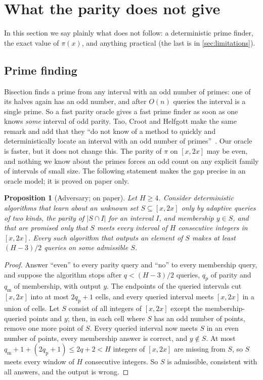 \documentclass[10pt]{amsart}
\theoremstyle{plain}
\newtheorem{proposition}[theorem]{Proposition}
\theoremstyle{definition}
\theoremstyle{remark}
\numberwithin{equation}{section}
\begin{document}
\section{What the parity does not give}\label{sec:not}

In this section we say plainly what does not follow: a deterministic prime finder, the exact value of
$\pi(x)$, and anything practical (the last is in \cref{sec:limitations}).

\subsection{Prime finding}
Bisection finds a prime from any interval with an odd number of primes: one of its halves again has an
odd number, and after $O(n)$ queries the interval is a single prime. So a fast parity oracle gives a fast
prime finder as soon as one knows \emph{some} interval of odd parity. Tao, Croot and Helfgott make the
same remark and add that they ``do not know of a method to quickly and deterministically locate an
interval with an odd number of primes''~\cite[\S1]{TCH12}. Our oracle is faster, but it does not change
this. The parity of $\pi$ on $[x,2x]$ may be even, and nothing we know about the primes forces an odd
count on any explicit family of intervals of small size. The following statement makes the gap precise in
an oracle model; it is proved on paper only.

\begin{proposition}[Adversary; on paper]\label{prop:adv}
Let $H\ge4$. Consider deterministic algorithms that learn about an unknown set $S\subseteq[x,2x]$ only
by adaptive queries of two kinds, the parity of $|S\cap I|$ for an interval $I$, and membership $y\in S$,
and that are promised only that $S$ meets every interval of $H$ consecutive integers in $[x,2x]$. Every
such algorithm that outputs an element of $S$ makes at least $(H-3)/2$ queries on some admissible $S$.
\end{proposition}

\begin{proof}
Answer ``even'' to every parity query and ``no'' to every membership query, and suppose the algorithm
stops after $q<(H-3)/2$ queries, $q_{\mathrm p}$ of parity and $q_{\mathrm m}$ of membership, with
output $y$. The endpoints of the queried intervals cut $[x,2x]$ into at most $2q_{\mathrm p}+1$ cells, and every queried interval meets $[x,2x]$ in a union of cells. Let $S$ consist of
all integers of $[x,2x]$ except the membership-queried points and $y$; then, in each cell where $S$ has
an odd number of points, remove one more point of $S$. Every queried interval now meets $S$ in an even
number of points, every membership answer is correct, and $y\notin S$. At most
$q_{\mathrm m}+1+(2q_{\mathrm p}+1)\le2q+2<H$ integers of $[x,2x]$ are missing from $S$, so $S$ meets every
window of $H$ consecutive integers. So $S$ is admissible, consistent with all answers, and the output is
wrong.
\end{proof}
\end{document}
